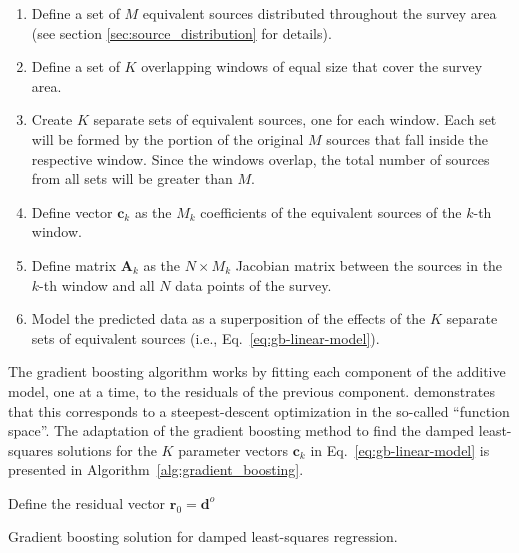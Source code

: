 \begin{enumerate}
  \item Define a set of $M$ equivalent sources distributed throughout the
    survey area (see section \ref{sec:source_distribution} for details).
  \item Define a set of $K$ overlapping windows of equal size that cover the
    survey area.
  \item Create $K$ separate sets of equivalent sources, one for each window.
    Each set will be formed by the portion of the original $M$ sources that
    fall inside the respective window.
    Since the windows overlap, the total number of sources from all sets will
    be greater than $M$.
  \item Define vector $\mathbf{c}_k$ as the $M_k$ coefficients of the
    equivalent sources of the $k$-th window.
  \item Define matrix $\mathbf{A}_k$ as the $N \times M_k$ Jacobian matrix
    between the sources in the $k$-th window and all $N$ data points of the
    survey.
  \item Model the predicted data as a superposition of the effects of the $K$
    separate sets of equivalent sources (i.e., Eq.~\ref{eq:gb-linear-model}).
\end{enumerate}

The gradient boosting algorithm works by fitting each component of the
additive model, one at a time, to the residuals of the previous component.
\citet{friedman2001} demonstrates that this corresponds to a steepest-descent
optimization in the so-called ``function space''.
The adaptation of the gradient boosting method to find the damped least-squares
solutions for the $K$ parameter vectors $\mathbf{c}_k$ in
Eq.~\ref{eq:gb-linear-model} is presented in
Algorithm~\ref{alg:gradient_boosting}.

\begin{algorithm}[!h]
  \DontPrintSemicolon
  Define the residual vector $\mathbf{r}_{0} = \mathbf{d}^o$ \;
  \BlankLine
  \caption{Gradient boosting solution for damped least-squares regression.}
  \label{alg:gradient_boosting}
\end{algorithm}

